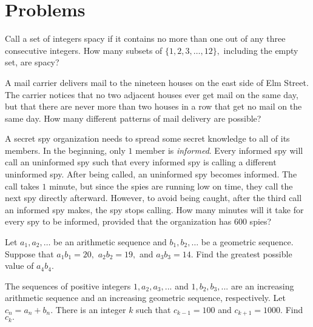 \documentclass{article}
\begin{document}
\pagebreak

\section{Problems}
    
\begin{prob}[AMC 12A 2007/25]{2}
Call a set of integers spacy if it contains no more than one out of any three consecutive integers. How many subsets of $\{1,2,3,\ldots,12\},$ including the empty set, are spacy?
\end{prob}

\begin{prob}[AIME I 2001/14]{2}
A mail carrier delivers mail to the nineteen houses on the east side of Elm Street. The carrier notices that no two adjacent houses ever get mail on the same day, but that there are never more than two houses in a row that get no mail on the same day. How many different patterns of mail delivery are possible?
\end{prob}

\begin{prob}{3}
A secret spy organization needs to spread some secret knowledge to all of its members. In the beginning, only $1$ member is \textit{informed}. Every informed spy will call an uninformed spy such that every informed spy is calling a different uninformed spy. After being called, an uninformed spy becomes informed. The call takes $1$ minute, but since the spies are running low on time, they call the next spy directly afterward. However, to avoid being caught, after the third call an informed spy makes, the spy stops calling. How many minutes will it take for every spy to be informed, provided that the organization has $600$ spies?
\end{prob}

\begin{prob}[HMMT 2019]{3}
Let $a_1,a_2,\dots$ be an arithmetic sequence and $b_1,b_2,\dots$ be a geometric sequence. Suppose that $a_1b_1=20,$ $a_2b_2=19,$ and $a_3b_3=14.$ Find the greatest possible value of $a_4b_4.$
\end{prob}

\begin{prob}[AIME II 2016/9]{3}
The sequences of positive integers $1,a_2, a_3,...$ and $1,b_2, b_3,...$ are an increasing arithmetic sequence and an increasing geometric sequence, respectively. Let $c_n=a_n+b_n$. There is an integer $k$ such that $c_{k-1}=100$ and $c_{k+1}=1000$. Find $c_k.$
\end{prob}
\end{document}
